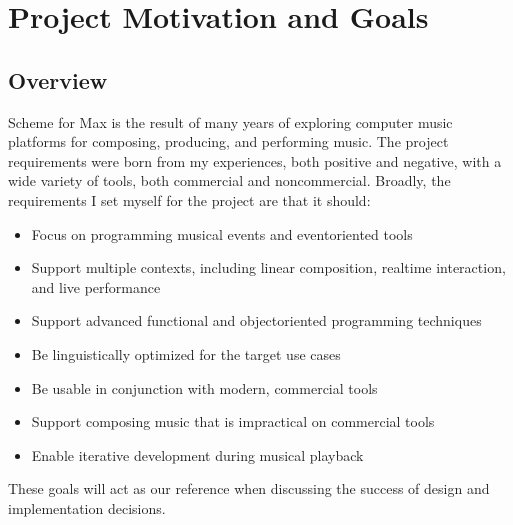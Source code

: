 \documentclass[letterpaper,10pt,english]{sphinxmanual}
\begin{document}
\sphinxstepscope


\chapter{Project Motivation and Goals}
\label{\detokenize{goals:project-motivation-and-goals}}\label{\detokenize{goals::doc}}

\section{Overview}
\label{\detokenize{goals:overview}}
\sphinxAtStartPar
Scheme for Max is the result of many years of exploring computer music platforms for composing, producing,
and performing music.
The project requirements were born from my experiences, both positive and negative, with a wide variety
of tools, both commercial and non\sphinxhyphen{}commercial.
Broadly, the requirements I set myself for the project are that it should:
\begin{itemize}
\item {} 
\sphinxAtStartPar
Focus on programming musical events and event\sphinxhyphen{}oriented tools

\item {} 
\sphinxAtStartPar
Support multiple contexts, including linear composition, real\sphinxhyphen{}time interaction, and live performance

\item {} 
\sphinxAtStartPar
Support advanced functional and object\sphinxhyphen{}oriented programming techniques

\item {} 
\sphinxAtStartPar
Be linguistically optimized for the target use cases

\item {} 
\sphinxAtStartPar
Be usable in conjunction with modern, commercial tools

\item {} 
\sphinxAtStartPar
Support composing music that is impractical on commercial tools

\item {} 
\sphinxAtStartPar
Enable iterative development during musical playback

\end{itemize}

\sphinxAtStartPar
These goals will act as our reference when discussing the success of design and implementation decisions.
\end{document}
